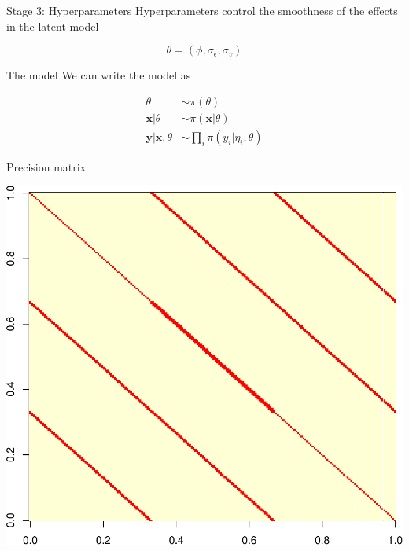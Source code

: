 \documentclass[
  ignorenonframetext,
]{beamer}
\begin{document}
\begin{frame}{Stage 3: Hyperparameters}
\protect\hypertarget{stage-3-hyperparameters}{}
Hyperparameters control the smoothness of the effects in the latent
model

\[
\theta = (\phi, \sigma_{\epsilon}, \sigma_v)
\]
\end{frame}

\begin{frame}{The model}
\protect\hypertarget{the-model}{}
We can write the model as

\[
\begin{aligned}
\theta & \sim \pi(\theta)\\
\mathbf{x}|\theta& \sim \pi(\mathbf{x}|\theta)\\
\mathbf{y}|\mathbf{x},\theta & \sim \prod_i\pi(y_i|\eta_i,\theta)
\end{aligned}
\]
\end{frame}

\begin{frame}{Precision matrix}
\protect\hypertarget{precision-matrix}{}
\begin{center}\includegraphics[width=0.8\linewidth]{graphics/Q2} \end{center}
\end{frame}
\end{document}
